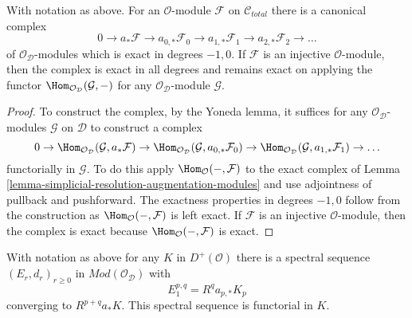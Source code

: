 \begin{lemma}
\label{lemma-augmentation-cech-complex-modules}
With notation as above.
For an $\mathcal{O}$-module $\mathcal{F}$ on $\mathcal{C}_{total}$
there is a canonical complex
$$
0 \to a_*\mathcal{F} \to a_{0, *}\mathcal{F}_0 \to a_{1, *}\mathcal{F}_1 \to
a_{2, *}\mathcal{F}_2 \to \ldots
$$
of $\mathcal{O}_\mathcal{D}$-modules which is exact in degrees $-1, 0$.
If $\mathcal{F}$ is an injective $\mathcal{O}$-module, then the complex
is exact in all degrees and remains exact on applying the functor
$\Hom_{\mathcal{O}_\mathcal{D}}(\mathcal{G}, -)$ for any
$\mathcal{O}_\mathcal{D}$-module $\mathcal{G}$.
\end{lemma}

\begin{proof}
To construct the complex, by the Yoneda lemma, it suffices for any
$\mathcal{O}_\mathcal{D}$-modules $\mathcal{G}$ on $\mathcal{D}$
to construct a complex
$$
0 \to \Hom_{\mathcal{O}_\mathcal{D}}(\mathcal{G}, a_*\mathcal{F}) \to
\Hom_{\mathcal{O}_\mathcal{D}}(\mathcal{G}, a_{0, *}\mathcal{F}_0) \to
\Hom_{\mathcal{O}_\mathcal{D}}(\mathcal{G}, a_{1, *}\mathcal{F}_1) \to \ldots
$$
functorially in $\mathcal{G}$. To do this apply
$\Hom_\mathcal{O}(-, \mathcal{F})$
to the exact complex of
Lemma \ref{lemma-simplicial-resolution-augmentation-modules}
and use adjointness of pullback and pushforward.
The exactness properties in degrees $-1, 0$ follow from
the construction as $\Hom_\mathcal{O}(-, \mathcal{F})$ is left exact.
If $\mathcal{F}$ is an injective $\mathcal{O}$-module, then the
complex is exact because $\Hom_\mathcal{O}(-, \mathcal{F})$ is exact.
\end{proof}

\begin{lemma}
\label{lemma-augmentation-spectral-sequence-modules}
With notation as above for any $K$ in $D^+(\mathcal{O})$ there is a spectral
sequence $(E_r, d_r)_{r \geq 0}$ in $\textit{Mod}(\mathcal{O}_\mathcal{D})$
with
$$
E_1^{p, q} = R^qa_{p, *} K_p
$$
converging to $R^{p + q}a_*K$. This spectral sequence is functorial in $K$.
\end{lemma}

